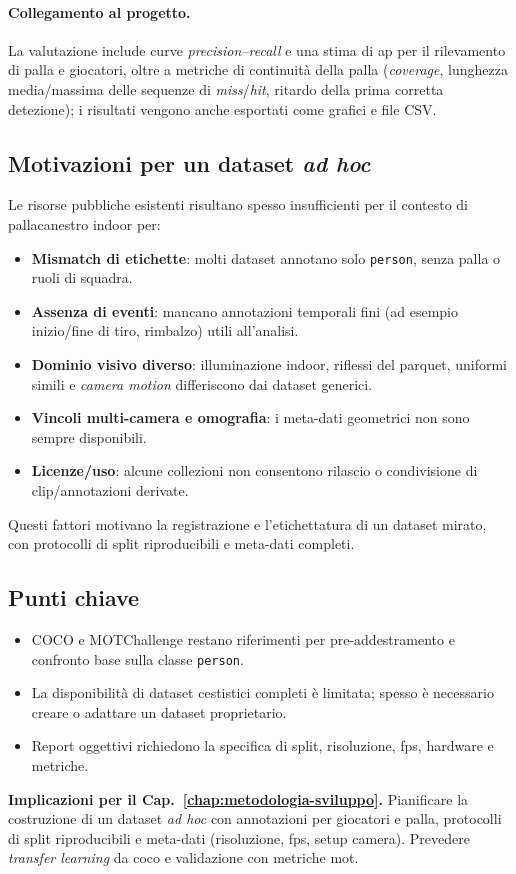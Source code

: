 \documentclass[12pt,a4paper,openright,twoside]{book}
\begin{document}
\paragraph{Collegamento al progetto.} La valutazione include curve \emph{precision–recall} e una stima di \ac{ap} per il
rilevamento di palla e giocatori, oltre a metriche di continuità della palla (\emph{coverage}, lunghezza media/massima delle
sequenze di \emph{miss}/\emph{hit}, ritardo della prima corretta detezione); i risultati vengono anche esportati come grafici e file CSV.

\subsection{Motivazioni per un dataset \emph{ad hoc}}
Le risorse pubbliche esistenti risultano spesso insufficienti per il contesto di pallacanestro indoor per:
\begin{itemize}
  \item \textbf{Mismatch di etichette}: molti dataset annotano solo \texttt{person}, senza palla o ruoli di squadra.
  \item \textbf{Assenza di eventi}: mancano annotazioni temporali fini (ad esempio inizio/fine di tiro, rimbalzo) utili all'analisi.
  \item \textbf{Dominio visivo diverso}: illuminazione indoor, riflessi del parquet, uniformi simili e \emph{camera motion} differiscono dai dataset generici.
  \item \textbf{Vincoli multi-camera e omografia}: i meta-dati geometrici non sono sempre disponibili.
  \item \textbf{Licenze/uso}: alcune collezioni non consentono rilascio o condivisione di clip/annotazioni derivate.
\end{itemize}
Questi fattori motivano la registrazione e l'etichettatura di un dataset mirato, con protocolli di split riproducibili e meta-dati completi.


\subsection*{Punti chiave}
\begin{itemize}
  \item COCO e MOTChallenge restano riferimenti per pre-addestramento e confronto base sulla classe \texttt{person}.
  \item La disponibilità di dataset cestistici completi è limitata; spesso è necessario creare o adattare un dataset proprietario.
  \item Report oggettivi richiedono la specifica di split, risoluzione, \ac{fps}, hardware e metriche.
\end{itemize}
\textbf{Implicazioni per il Cap.~\ref{chap:metodologia-sviluppo}.}
Pianificare la costruzione di un dataset \emph{ad hoc} con annotazioni per giocatori e palla, protocolli di split riproducibili
e meta-dati (risoluzione, \ac{fps}, setup camera). Prevedere \emph{transfer learning} da \ac{coco} e validazione con metriche \ac{mot}.
\end{document}
